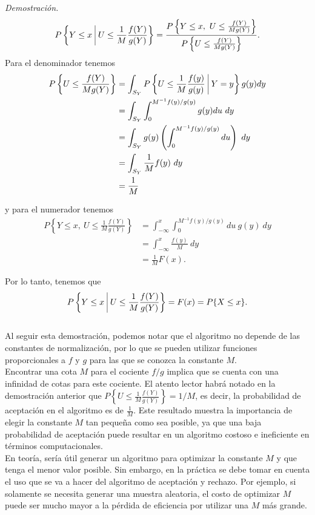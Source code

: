 \documentclass[11pt,a4paper]{article}
\begin{document}
\textit{Demostración.}
$$P\left\lbrace Y \leq x \  \vline \ U\leq \frac{1}{M}\frac{f(Y)}{g(Y)}\right\rbrace = \frac{P\left\lbrace Y\leq x, \ U \leq \frac{f(Y)}{Mg(Y)}\right\rbrace}{P\left\lbrace U \leq \frac{f(Y)}{Mg(Y)}\right\rbrace}.$$ Para el denominador tenemos 
\begin{align*}
P\left\lbrace U \leq \frac{f(Y)}{Mg(Y)}\right\rbrace &= \int_{S_Y}P\left\lbrace U \leq \frac{1}{M}\frac{f(y)}{g(y)} \ \vline \ Y=y\right\rbrace g(y) dy\\
&= \int_{S_Y}\int_0^{M^{-1} f(y)/g(y)} g(y)du \ dy\\
&= \int_{S_Y}g(y)\left(\int_0^{M^{-1} f(y)/g(y)} du\right)\ dy\\
&= \int_{S_Y}\frac{1}{M}f(y) \ dy\\
&= \frac{1}{M}
\end{align*}

y para el numerador tenemos
\begin{align*}
P\left\lbrace Y \leq x, \ U \leq \frac{1}{M}\frac{f(Y)}{g(Y)}\right\rbrace &= \int_{-\infty}^x\int_0^{M^{-1} f(y)/g(y)} du \ g(y) \ dy\\
&= \int_{-\infty}^x \frac{f(y)}{M} \ dy\\
&= \frac{1}{M} F(x).
\end{align*}

Por lo tanto, tenemos que $$P\left\lbrace Y \leq x \  \vline \ U\leq \frac{1}{M}\frac{f(Y)}{g(Y)}\right\rbrace = F(x) = P\{X \leq x\}.$$\\

Al seguir esta demostración, podemos notar que el algoritmo no depende de las constantes de normalización, por lo que se pueden utilizar funciones proporcionales a $f$ y $g$ para las que se conozca la constante $M$.\\

Encontrar una cota $M$ para el cociente $f/g$ implica que se cuenta con una infinidad de cotas para este cociente. El atento lector habrá notado en la demostración anterior que $P\left\lbrace U \leq \frac{1}{M}\frac{f(Y)}{g(Y)}\right\rbrace = 1/M$, es decir, la probabilidad de aceptación en el algoritmo es de $\frac{1}{M}$. Este resultado muestra la importancia de elegir la constante $M$ tan pequeña como sea posible, ya que una baja probabilidad de aceptación puede resultar en un algoritmo costoso e ineficiente en términos computacionales.\\

En teoría, sería útil generar un algoritmo para optimizar la constante $M$ y que tenga el menor valor posible. Sin embargo, en la práctica se debe tomar en cuenta el uso que se va a hacer del algoritmo de aceptación y rechazo. Por ejemplo, si solamente se necesita generar una muestra aleatoria, el costo de optimizar $M$ puede ser mucho mayor a la pérdida de eficiencia por utilizar una $M$ más grande.\\
\end{document}
